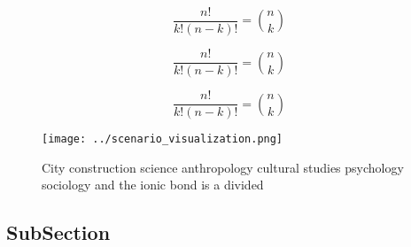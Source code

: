 \documentclass[a4paper]{article}
\begin{document}
\[ \frac{n!}{k!(n-k)!} = \binom{n}{k} \]

\[ \frac{n!}{k!(n-k)!} = \binom{n}{k} \]

\[ \frac{n!}{k!(n-k)!} = \binom{n}{k} \]

\begin{figure}
\centering
\texttt{[image: ../scenario\_visualization.png]}
\caption{City construction science anthropology cultural studies psychology sociology and the ionic bond is a divided 
}
\end{figure}
 
\subsection{SubSection}
\end{document}
